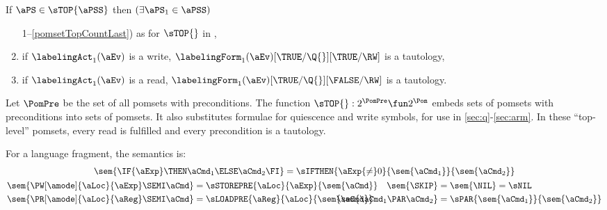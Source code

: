 \begin{definition}
  \label{def:pomsets-top}
  \noindent
  If $\aPS \in \sTOP{\aPSS}$ then
  $(\exists\aPS_1\in\aPSS)$
  \begin{enumerate}[topsep=0pt]
    \setcounter{enumi}{\value{pomsetTopCount}}
  \item[1--\ref{pomsetTopCountLast})] %
    as for $\sTOP{}$ in ,
  \item \label{top-kappa-write} %
    if $\labelingAct_1(\aEv)$ is a write,
    $\labelingForm_1(\aEv) [\TRUE/\Q{}][\TRUE/\RW]$ is a tautology,
  \item \label{top-kappa-read} %
    if $\labelingAct_1(\aEv)$ is a read,
    $\labelingForm_1(\aEv) [\TRUE/\Q{}][\FALSE/\RW]$ is a tautology.
    \setcounter{pomsetPreTopCount}{\value{enumi}}
  \end{enumerate}  
\end{definition}
Let $\PomPre$ be the set of all pomsets with preconditions.
The function $\sTOP{}:2^{\PomPre}\fun2^{\Pom}$ embeds sets of pomsets with preconditions into sets of
pomsets.  It also substitutes formulae for quiescence and write symbols, for
use in \textsection\ref{sec:q}-\ref{sec:arm}.  In these ``top-level''
pomsets, every read is fulfilled and every precondition is a tautology.
\begin{definition}
  \noindent
  For a language fragment, the semantics is:
  \begin{gather*}
    \sem{\IF{\aExp}\THEN\aCmd_1\ELSE\aCmd_2\FI} = \sIFTHEN{\aExp{\neq}0}{\sem{\aCmd_1}}{\sem{\aCmd_2}}
    \\
    \begin{aligned}
      \sem{\PW[\amode]{\aLoc}{\aExp}\SEMI \aCmd} &=
      \sSTOREPRE{\aLoc}{\aExp}{\sem{\aCmd}}
      &
      \sem{\SKIP} &= \sem{\NIL} = \sNIL 
      \\
      \sem{\PR[\amode]{\aLoc}{\aReg}\SEMI \aCmd} &=
      \sLOADPRE{\aReg}{\aLoc}{\sem{\aCmd}}
      &
      \makebox[3.5em][r]{$\sem{\aCmd_1 \PAR \aCmd_2}$} &= \sPAR{\sem{\aCmd_1}}{\sem{\aCmd_2}}
    \end{aligned}
  \end{gather*}
\end{definition}

